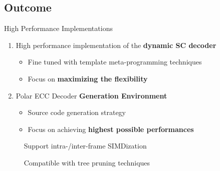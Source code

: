 \subsection[Outcome]{Outcome}

\begin{frame}{High Performance Implementations}
  \vfill
  \begin{enumerate}
    \item High performance implementation of the \textbf{dynamic SC decoder}
    \begin{itemize}
      \item Fine tuned with template meta-programming techniques
      \item Focus on \textbf{maximizing the flexibility}
    \end{itemize}
    \pause
    \vspace{0.3cm}
    \item Polar ECC Decoder \textbf{Generation Environment}
    \begin{itemize}
      \item Source code generation strategy
      \item Focus on achieving \textbf{highest possible performances}
    \end{itemize}
  \end{enumerate}
  \vfill
  \pause

  \vspace*{.5em}
  ~~~~~{\color{bleuUni}\Large\MVRightarrow} Support intra-/inter-frame SIMDization

  \vspace*{.5em}
  ~~~~~{\color{bleuUni}\Large\MVRightarrow} Compatible with tree pruning techniques

  \vfill
\end{frame}

